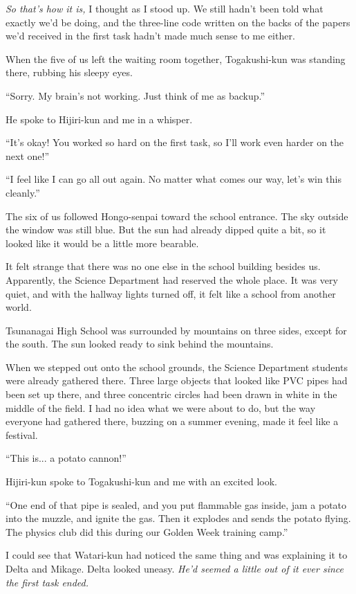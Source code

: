 \documentclass[
    a4paper,
    12pt,
    twoside,
    openany,
    UTF8,
    fontset=windows
]{ctexbook}
\begin{document}
\textit{So that's how it is,} I thought as I stood up. We still hadn't been told what exactly we'd be doing, and the three-line code written on the backs of the papers we'd received in the first task hadn't made much sense to me either.

When the five of us left the waiting room together, Togakushi-kun was standing there, rubbing his sleepy eyes.

``Sorry. My brain's not working. Just think of me as backup.''

He spoke to Hijiri-kun and me in a whisper.

``It's okay! You worked so hard on the first task, so I'll work even harder on the next one!''

``I feel like I can go all out again. No matter what comes our way, let's win this cleanly.''

The six of us followed Hongo-senpai toward the school entrance. The sky outside the window was still blue. But the sun had already dipped quite a bit, so it looked like it would be a little more bearable.

It felt strange that there was no one else in the school building besides us. Apparently, the Science Department had reserved the whole place. It was very quiet, and with the hallway lights turned off, it felt like a school from another world.

Tsunanagai High School was surrounded by mountains on three sides, except for the south. The sun looked ready to sink behind the mountains.

When we stepped out onto the school grounds, the Science Department students were already gathered there. Three large objects that looked like PVC pipes had been set up there, and three concentric circles had been drawn in white in the middle of the field. I had no idea what we were about to do, but the way everyone had gathered there, buzzing on a summer evening, made it feel like a festival.

``This is... a potato cannon!''

Hijiri-kun spoke to Togakushi-kun and me with an excited look.

``One end of that pipe is sealed, and you put flammable gas inside, jam a potato into the muzzle, and ignite the gas. Then it explodes and sends the potato flying. The physics club did this during our Golden Week training camp.''

I could see that Watari-kun had noticed the same thing and was explaining it to Delta and Mikage. Delta looked uneasy. \textit{He'd seemed a little out of it ever since the first task ended.}
\end{document}
